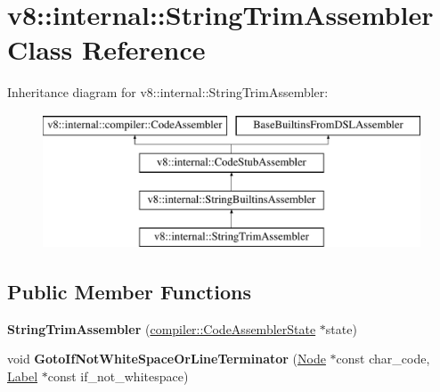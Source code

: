\hypertarget{classv8_1_1internal_1_1StringTrimAssembler}{}\section{v8\+:\+:internal\+:\+:String\+Trim\+Assembler Class Reference}
\label{classv8_1_1internal_1_1StringTrimAssembler}
Inheritance diagram for v8\+:\+:internal\+:\+:String\+Trim\+Assembler\+:\begin{figure}[H]
\begin{center}
\leavevmode
\includegraphics[height=4.000000cm]{classv8_1_1internal_1_1StringTrimAssembler}
\end{center}
\end{figure}
\subsection*{Public Member Functions}
\begin{DoxyCompactItemize}
\item 
\mbox{\label{classv8_1_1internal_1_1StringTrimAssembler_aa7be25da0064b8cfccc140b267888ecc}} 
{\bfseries String\+Trim\+Assembler} (\mbox{\hyperlink{classv8_1_1internal_1_1compiler_1_1CodeAssemblerState}{compiler\+::\+Code\+Assembler\+State}} $\ast$state)
\item 
\mbox{\label{classv8_1_1internal_1_1StringTrimAssembler_a93e9de0b4ef1758f5bba9262580b9c1f}} 
void {\bfseries Goto\+If\+Not\+White\+Space\+Or\+Line\+Terminator} (\mbox{\hyperlink{classv8_1_1internal_1_1compiler_1_1Node}{Node}} $\ast$const char\+\_\+code, \mbox{\hyperlink{classv8_1_1internal_1_1compiler_1_1CodeAssemblerLabel}{Label}} $\ast$const if\+\_\+not\+\_\+whitespace)
\end{DoxyCompactItemize}
